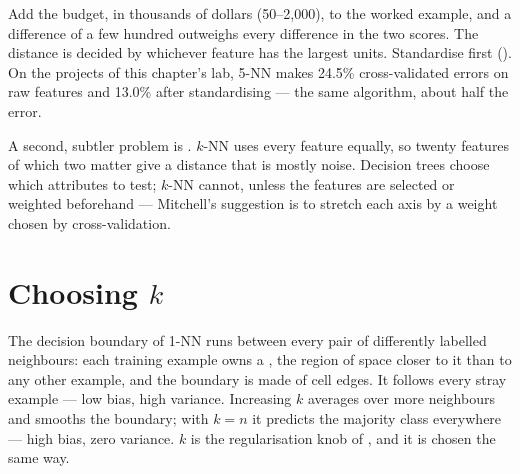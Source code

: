 \begin{alertbox}
Add the budget, in thousands of dollars (50--2{,}000), to the worked example, and
a difference of a few hundred outweighs every difference in the two scores. The
distance is decided by whichever feature has the largest units. Standardise first
(). On the projects of this chapter's lab, 5-NN makes 24.5\%
cross-validated errors on raw features and 13.0\% after standardising --- the
same algorithm, about half the error.
\end{alertbox}

A second, subtler problem is . $k$-NN uses every feature
equally, so twenty features of which two matter give a distance that is mostly
noise. Decision trees choose which attributes to test; $k$-NN cannot, unless the
features are selected or weighted beforehand --- Mitchell's suggestion is to
stretch each axis by a weight chosen by cross-validation.

\section{Choosing $k$}

The decision boundary of 1-NN runs between every pair of differently labelled
neighbours: each training example owns a , the region of space
closer to it than to any other example, and the boundary is made of cell edges.
It follows every stray example --- low bias, high variance. Increasing $k$ averages
over more neighbours and smooths the boundary; with $k = n$ it predicts the
majority class everywhere --- high bias, zero variance. $k$ is the regularisation
knob of , and it is chosen the same way.

